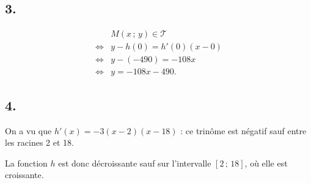 \subsection*{3.}

\begin{align*}
&M(x \,;\, y) \in \mathcal{T} \\
\iff &y - h(0) = h'(0)(x - 0) \\
\iff &y - (-490) = -108x \\
\iff &y = -108x - 490.
\end{align*}

\subsection*{4.}

On a vu que \(h'(x) = -3(x - 2)(x - 18)\) : ce trinôme est négatif sauf entre les racines 2 et 18.

La fonction \(h\) est donc décroissante sauf sur l'intervalle \([2 \,;\, 18]\), où elle est croissante.

\begin{center}
\end{center}
